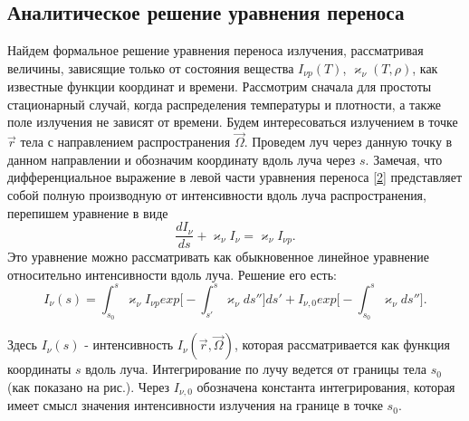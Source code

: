 \subsection{Аналитическое решение уравнения переноса}
Найдем формальное решение уравнения переноса излучения, рассматривая величины, зависящие только от состояния вещества $I_{\nu p}(T)$, $\varkappa_{\nu}(T, \rho)$, как известные функции координат и времени. Рассмотрим сначала для простоты стационарный случай, когда распределения температуры и плотности, а также поле излучения не зависят от времени. Будем интересоваться излучением в точке $\vec r$ тела с направлением распространения $\vec \Omega$. Проведем луч через данную точку в данном направлении и обозначим координату вдоль луча через $s$. Замечая, что дифференциальное выражение в левой части уравнения переноса \eqref{2} представляет собой полную производную от интенсивности вдоль луча распространения, перепишем уравнение в виде
\begin {equation}
\frac{dI_{\nu}}{ds} + \varkappa_{\nu}I_{\nu} = \varkappa_{\nu}I_{\nu p}.
\end {equation}
Это уравнение можно рассматривать как обыкновенное линейное уравнение относительно интенсивности вдоль луча. Решение его есть:
\begin {equation}
I_{\nu}(s) = \int_{s_0}^s\varkappa_{\nu}I_{\nu p} exp\Big[-\int_{s'}^s\varkappa_{\nu}ds''\Big]ds' + I_{\nu,0} exp\Big[-\int_{s_0}^s \varkappa_{\nu}ds''\Big].
\end {equation}

Здесь $I_{\nu}(s)$ - интенсивность $I_{\nu}(\vec r, \vec\Omega)$, которая рассматривается как функция координаты $s$ вдоль луча. Интегрирование по лучу ведется от границы тела $s_0$ (как показано на рис.). Через $I_{\nu, 0}$ обозначена константа интегрирования, которая имеет смысл значения интенсивности излучения на границе в точке $s_0$.

